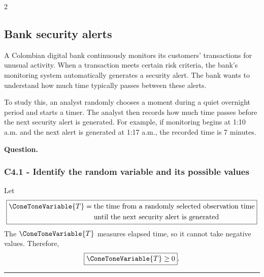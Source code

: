\begin{multicols}{2}
	
\subsection{Bank security alerts}\label{sec:c4-identify-bank}

A Colombian digital bank continuously monitors its customers' transactions for
unusual activity. When a transaction meets certain risk criteria, the bank's
monitoring system automatically generates a security alert. The bank wants to
understand how much time typically passes between these alerts.

To study this, an analyst randomly chooses a moment during a quiet overnight
period and starts a timer. The analyst then records how much time passes before
the next security alert is generated. For example, if monitoring begins at
1:10 a.m. and the next alert is generated at 1:17 a.m., the recorded time is
7 minutes.



\textbf{Question.}
\begin{enumerate}
\end{enumerate}

\columnbreak

\subsubsection*{C4.1 - Identify the random variable and its possible values}\label{subsec:c4-identify-bank-a}
Let
\[
\boxed{
	\begin{aligned}
		\ConeToneVariable{T}={}&\text{the time from a randomly selected observation time}\\
		&\text{until the next security alert is generated}
\end{aligned}}
\]
The   $\ConeToneVariable{T}$ measures elapsed time, so it cannot take negative
values. Therefore,
\[
\boxed{\ConeToneVariable{T}\geq0}.
\]

\end{multicols}

\noindent\rule{\textwidth}{0.4pt}

\newpage

